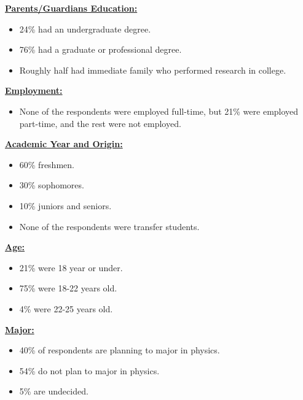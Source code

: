\documentclass[oneside]{book}   %
\begin{document}
\noindent\underline{\textbf{Parents/Guardians Education:}}
\begin{itemize}
	\item 24\% had an undergraduate degree.
	\item 76\% had a graduate or professional degree.
	\item Roughly half had immediate family who performed research in college.
\end{itemize}

\noindent\underline{\textbf{Employment:}}
\begin{itemize}
	\item None of the respondents were employed full-time, but 21\% were employed part-time, and the rest were not employed.
\end{itemize}

\noindent\underline{\textbf{Academic Year and Origin:}}
\begin{itemize}
	\item 60\% freshmen.
	\item 30\% sophomores.
	\item 10\% juniors and seniors.
	\item None of the respondents were transfer students.
\end{itemize}

\noindent\underline{\textbf{Age:}}
\begin{itemize}
	\item 21\% were 18 year or under.
	\item 75\% were 18-22 years old.
	\item 4\% were 22-25 years old.
\end{itemize}

\noindent\underline{\textbf{Major:}}
\begin{itemize}
	\item 40\% of respondents are planning to major in physics.
	\item 54\% do not plan to major in physics.
	\item 5\% are undecided.
\end{itemize}
\end{document}
